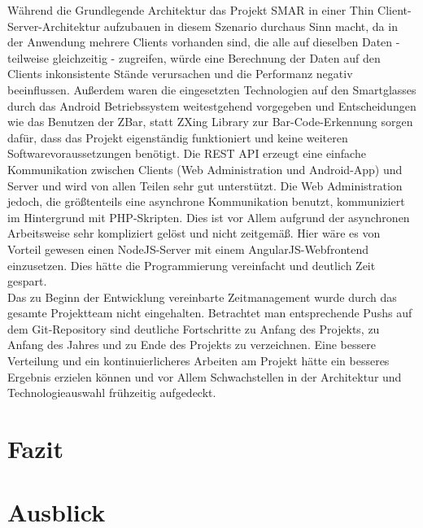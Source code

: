 Während die Grundlegende Architektur das Projekt \ac{SMAR} in einer Thin Client-Server-Architektur aufzubauen in diesem Szenario durchaus Sinn macht, da in der Anwendung mehrere Clients vorhanden sind, die alle auf dieselben Daten - teilweise gleichzeitig - zugreifen, würde eine Berechnung der Daten auf den Clients inkonsistente Stände verursachen und die Performanz negativ beeinflussen. Außerdem waren die eingesetzten Technologien auf den Smartglasses durch das Android Betriebssystem weitestgehend vorgegeben und Entscheidungen wie \zB das Benutzen der ZBar, statt ZXing Library zur Bar-Code-Erkennung sorgen dafür, dass das Projekt eigenständig funktioniert und keine weiteren Softwarevoraussetzungen benötigt. Die \ac{REST} \ac{API} erzeugt eine einfache Kommunikation zwischen Clients (Web Administration und Android-App) und Server und wird von allen Teilen sehr gut unterstützt. Die Web Administration jedoch, die größtenteils eine asynchrone Kommunikation benutzt, kommuniziert im Hintergrund mit PHP-Skripten. Dies ist vor Allem aufgrund der asynchronen Arbeitsweise sehr kompliziert gelöst und nicht zeitgemäß. Hier wäre es von Vorteil gewesen einen NodeJS-Server mit einem AngularJS-Webfrontend einzusetzen. Dies hätte die Programmierung vereinfacht und deutlich Zeit gespart.\\

Das zu Beginn der Entwicklung vereinbarte Zeitmanagement wurde durch das gesamte Projektteam nicht eingehalten. Betrachtet man entsprechende Pushs auf dem Git-Repository sind deutliche Fortschritte zu Anfang des Projekts, zu Anfang des Jahres und zu Ende des Projekts zu verzeichnen. Eine bessere Verteilung und ein kontinuierlicheres Arbeiten am Projekt hätte ein besseres Ergebnis erzielen können und vor Allem Schwachstellen in der Architektur und Technologieauswahl frühzeitig aufgedeckt.

\chapter{Fazit}


\chapter{Ausblick}

